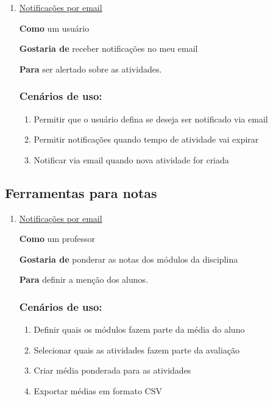 \begin{enumerate}
\item \underline{Notificações por email}

\textbf{Como} um usuário

\textbf{Gostaria de} receber notificações no meu email

\textbf{Para} ser alertado sobre as atividades.

\subsubsection*{Cenários de uso:}
  \begin{enumerate}
  \item Permitir que o usuário defina se deseja ser notificado via email
  \item Permitir notificações quando tempo de atividade vai expirar
  \item Notificar via email quando nova atividade for criada
  \end{enumerate}
\end{enumerate}

\subsection{Ferramentas para notas}

\begin{enumerate}
\item \underline{Notificações por email}

\textbf{Como} um professor

\textbf{Gostaria de} ponderar as notas dos módulos da disciplina

\textbf{Para} definir a menção dos alunos.

\subsubsection*{Cenários de uso:}
  \begin{enumerate}
  \item Definir quais os módulos fazem parte da média do aluno
  \item Selecionar quais as atividades fazem parte da avaliação
  \item Criar média ponderada para as atividades
  \item Exportar médias em formato CSV
  \end{enumerate}
\end{enumerate}
